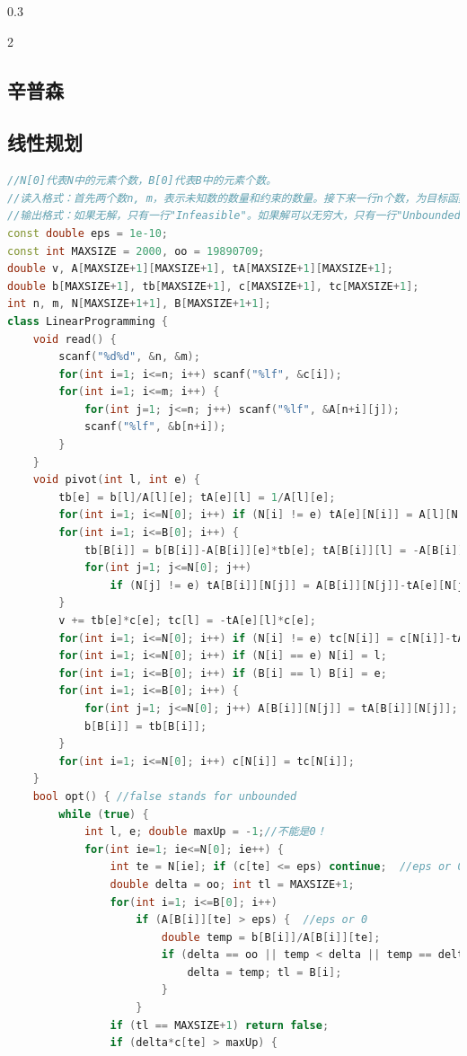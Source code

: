 \documentclass[landscape,a4paper]{article}
\begin{document}
\begin{spacing}{0.3}
\begin{multicols}{2}
	
	\subsection{辛普森}
	
	\subsection{线性规划}
\begin{lstlisting}[language=C++]
//N[0]代表N中的元素个数，B[0]代表B中的元素个数。
//读入格式：首先两个数n, m，表示未知数的数量和约束的数量。接下来一行n个数，为目标函数的系数。然后m行，每行m+1个数，表示一个约束。前m个数是系数，最后一个是常数项。
//输出格式：如果无解，只有一行"Infeasible"。如果解可以无穷大，只有一行"Unbounded"。否则，第一行为最大的目标函数值，接下来是每个未知数的值。
const double eps = 1e-10;
const int MAXSIZE = 2000, oo = 19890709;
double v, A[MAXSIZE+1][MAXSIZE+1], tA[MAXSIZE+1][MAXSIZE+1];
double b[MAXSIZE+1], tb[MAXSIZE+1], c[MAXSIZE+1], tc[MAXSIZE+1];
int n, m, N[MAXSIZE+1+1], B[MAXSIZE+1+1];
class LinearProgramming {
	void read() {
		scanf("%d%d", &n, &m);
		for(int i=1; i<=n; i++) scanf("%lf", &c[i]);
		for(int i=1; i<=m; i++) {
			for(int j=1; j<=n; j++) scanf("%lf", &A[n+i][j]);
			scanf("%lf", &b[n+i]);
		}
	}
	void pivot(int l, int e) {
		tb[e] = b[l]/A[l][e]; tA[e][l] = 1/A[l][e];
		for(int i=1; i<=N[0]; i++) if (N[i] != e) tA[e][N[i]] = A[l][N[i]]/A[l][e];
		for(int i=1; i<=B[0]; i++) {
			tb[B[i]] = b[B[i]]-A[B[i]][e]*tb[e]; tA[B[i]][l] = -A[B[i]][e]*tA[e][l];
			for(int j=1; j<=N[0]; j++)
				if (N[j] != e) tA[B[i]][N[j]] = A[B[i]][N[j]]-tA[e][N[j]]*A[B[i]][e];
		}
		v += tb[e]*c[e]; tc[l] = -tA[e][l]*c[e];
		for(int i=1; i<=N[0]; i++) if (N[i] != e) tc[N[i]] = c[N[i]]-tA[e][N[i]]*c[e];
		for(int i=1; i<=N[0]; i++) if (N[i] == e) N[i] = l;
		for(int i=1; i<=B[0]; i++) if (B[i] == l) B[i] = e;
		for(int i=1; i<=B[0]; i++) {
			for(int j=1; j<=N[0]; j++) A[B[i]][N[j]] = tA[B[i]][N[j]];
			b[B[i]] = tb[B[i]];
		}
		for(int i=1; i<=N[0]; i++) c[N[i]] = tc[N[i]];
	}
	bool opt() { //false stands for unbounded
		while (true) {
			int l, e; double maxUp = -1;//不能是0！
			for(int ie=1; ie<=N[0]; ie++) {
				int te = N[ie]; if (c[te] <= eps) continue;  //eps or 0
				double delta = oo; int tl = MAXSIZE+1;
				for(int i=1; i<=B[0]; i++)
					if (A[B[i]][te] > eps) {  //eps or 0
						double temp = b[B[i]]/A[B[i]][te];
						if (delta == oo || temp < delta || temp == delta && B[i] < tl) {
							delta = temp; tl = B[i];
						}
					}
				if (tl == MAXSIZE+1) return false;
				if (delta*c[te] > maxUp) {

\end{lstlisting}
\end{multicols}
\end{spacing}
\end{document}
